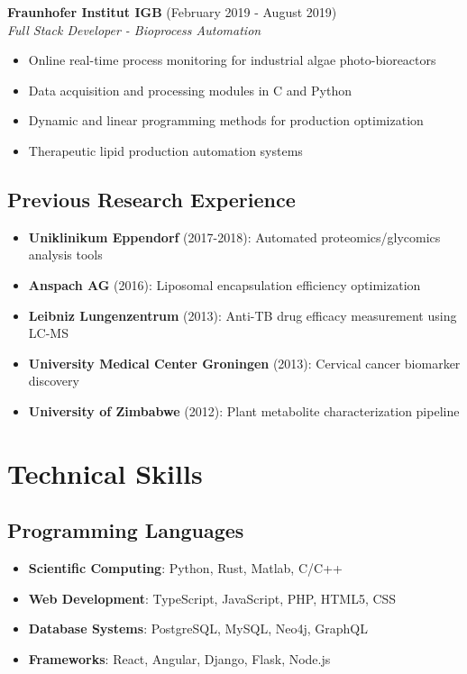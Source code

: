 \documentclass[11pt,a4paper]{article}
\begin{document}
\textbf{Fraunhofer Institut IGB} (February 2019 - August 2019)\\
\textit{Full Stack Developer - Bioprocess Automation}
\begin{itemize}[leftmargin=*,itemsep=0.1em]
\item Online real-time process monitoring for industrial algae photo-bioreactors
\item Data acquisition and processing modules in C and Python
\item Dynamic and linear programming methods for production optimization
\item Therapeutic lipid production automation systems
\end{itemize}

\subsection{Previous Research Experience}
\begin{itemize}[leftmargin=*,itemsep=0.1em]
\item \textbf{Uniklinikum Eppendorf} (2017-2018): Automated proteomics/glycomics analysis tools
\item \textbf{Anspach AG} (2016): Liposomal encapsulation efficiency optimization
\item \textbf{Leibniz Lungenzentrum} (2013): Anti-TB drug efficacy measurement using LC-MS
\item \textbf{University Medical Center Groningen} (2013): Cervical cancer biomarker discovery
\item \textbf{University of Zimbabwe} (2012): Plant metabolite characterization pipeline
\end{itemize}

\section{Technical Skills}

\subsection{Programming Languages}
\begin{itemize}[leftmargin=*,itemsep=0.1em]
\item \textbf{Scientific Computing}: Python, Rust, Matlab, C/C++
\item \textbf{Web Development}: TypeScript, JavaScript, PHP, HTML5, CSS
\item \textbf{Database Systems}: PostgreSQL, MySQL, Neo4j, GraphQL
\item \textbf{Frameworks}: React, Angular, Django, Flask, Node.js
\end{itemize}
\end{document}
